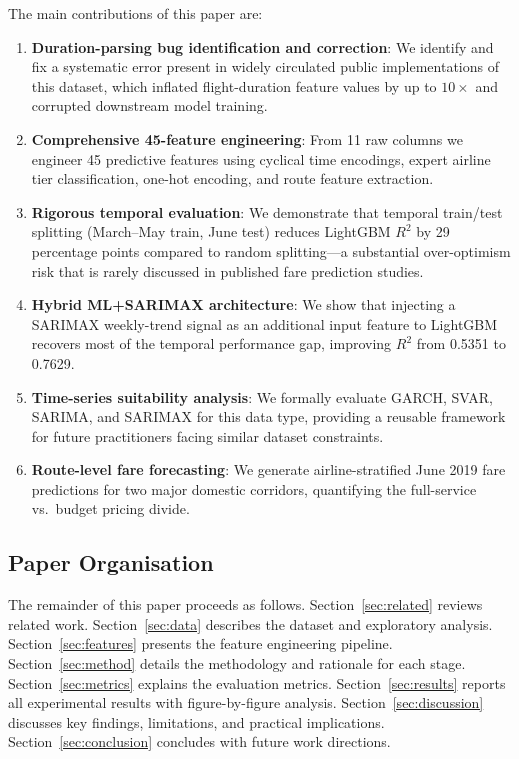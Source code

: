 \documentclass[12pt, a4paper]{article}
\begin{document}
The main contributions of this paper are:
\begin{enumerate}
    \item \textbf{Duration-parsing bug identification and correction}: We
    identify and fix a systematic error present in widely circulated public
    implementations of this dataset, which inflated flight-duration feature
    values by up to $10\times$ and corrupted downstream model training.

    \item \textbf{Comprehensive 45-feature engineering}: From 11 raw columns
    we engineer 45 predictive features using cyclical time encodings, expert
    airline tier classification, one-hot encoding, and route feature extraction.

    \item \textbf{Rigorous temporal evaluation}: We demonstrate that temporal
    train/test splitting (March--May train, June test) reduces LightGBM $R^2$
    by 29 percentage points compared to random splitting---a substantial
    over-optimism risk that is rarely discussed in published fare prediction studies.

    \item \textbf{Hybrid ML+SARIMAX architecture}: We show that injecting a
    SARIMAX weekly-trend signal as an additional input feature to LightGBM
    recovers most of the temporal performance gap, improving $R^2$ from 0.5351
    to 0.7629.

    \item \textbf{Time-series suitability analysis}: We formally evaluate GARCH,
    SVAR, SARIMA, and SARIMAX for this data type, providing a reusable framework
    for future practitioners facing similar dataset constraints.

    \item \textbf{Route-level fare forecasting}: We generate airline-stratified
    June 2019 fare predictions for two major domestic corridors, quantifying the
    full-service vs.\ budget pricing divide.
\end{enumerate}

\subsection{Paper Organisation}

The remainder of this paper proceeds as follows.
Section~\ref{sec:related} reviews related work.
Section~\ref{sec:data} describes the dataset and exploratory analysis.
Section~\ref{sec:features} presents the feature engineering pipeline.
Section~\ref{sec:method} details the methodology and rationale for each stage.
Section~\ref{sec:metrics} explains the evaluation metrics.
Section~\ref{sec:results} reports all experimental results with figure-by-figure
analysis.
Section~\ref{sec:discussion} discusses key findings, limitations, and practical
implications.
Section~\ref{sec:conclusion} concludes with future work directions.
\end{document}
